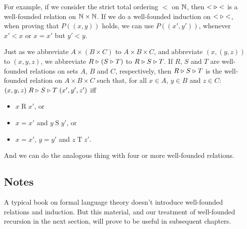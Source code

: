 For example, if we consider the strict total ordering $<$ on $\mathbb{N}$,
then ${<}\mathrel{\triangleright}{<}$ is a well-founded relation on $\mathbb{N}\times\mathbb{N}$.
If we do a well-founded induction on ${<}\mathrel{\triangleright}{<}$, when proving that
$P((x,y))$ holds, we can use $P((x',y'))$, whenever $x'<x$ or $x=x'$
but $y'<y$.

Just as we abbreviate $A\times(B\times C)$ to $A\times B\times C$,
and abbreviate $(x,(y,z))$ to $(x,y,z)$, we abbreviate $R\mathrel{\triangleright}(S\mathrel{\triangleright} T)$
to $R\mathrel{\triangleright} S\mathrel{\triangleright} T$.
If $R$, $S$ and $T$ are well-founded relations on sets $A$, $B$ and
$C$, respectively, then $R\mathrel{\triangleright} S\mathrel{\triangleright} T$ is the well-founded relation
on $A\times B\times C$ such that, for all $x\in A$, $y\in B$ and $z\in
C$: $(x,y,z)\mathrel{R\mathrel{\triangleright} S\mathrel{\triangleright} T}(x',y',z')$ iff
\begin{itemize}
\item $x\mathrel{R}x'$, or
\item $x=x'$ and $y\mathrel{S}y'$, or
\item $x=x'$, $y=y'$ and $z\mathrel{T}z'$.
\end{itemize}
And we can do the analogous thing with four or more well-founded
relations.
%

\subsection{Notes}

A typical book on formal language theory doesn't introduce well-founded
relations and induction.  But this material, and our treatment of
well-founded recursion in the next section, will prove to be useful
in subsequent chapters.

